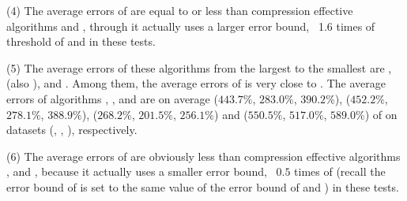 {{\ni (4) The average \sed errors of \bitt are equal to or less than compression effective algorithms \grts and \citt, through it actually uses a larger \sed error bound, \ie~1.6 times of \sed threshold of \grts and \citt in these tests.

\ni (5) The average \ped errors of these algorithms from the largest to the smallest are \sitt, \grts (also \citt), \bitt and \ldrh. Among them, the average \ped errors of \citt is very close to \grts. The average \ped errors of algorithms \grts, \citt, \bitt and \sitt are on average
($443.7\%$, $ 283.0\%$, $ 390.2\%$), ($452.2\%$, $278.1\%$, $388.9\%$), ($ 268.2\%$, $ 201.5\%$, $ 256.1\%$)
and ($550.5\%$, $517.0\%$, $589.0\%$)
of \ldrh on datasets (\mopsi, \sercar, \geolife), respectively.

\ni (6) The average \ped errors of \bitt are obviously less than compression effective algorithms \grts, \citt and \sitt, because it actually uses a smaller \ped error bound, \ie~$0.5$ times \ped of \sitt (recall the \ped error bound of \sitt is set to the same value of the \sed error bound of \grts and \citt) in these tests.



}}
